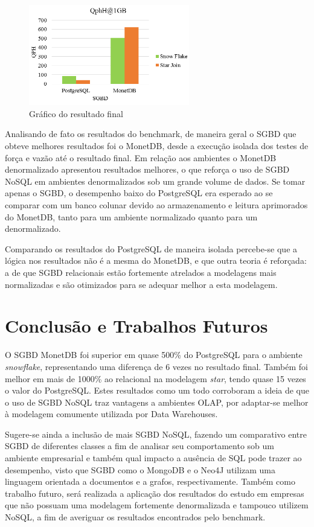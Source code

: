 \documentclass[conference]{IEEEtran}
\begin{document}
\begin{figure}[htpb]
  \centering
  \includegraphics[width=7cm]{resultado}
  \caption{Gráfico do resultado final}
  \label{fig:resultado}
\end{figure}

Analisando de fato os resultados do benchmark, de maneira geral o SGBD que obteve melhores resultados foi o MonetDB, desde a execução isolada dos testes de força e vazão até o resultado final. Em relação aos ambientes o MonetDB denormalizado apresentou resultados melhores, o que reforça o uso de SGBD NoSQL em ambientes denormalizados sob um grande volume de dados. Se tomar apenas o SGBD, o desempenho baixo do PostgreSQL era esperado ao se comparar com um banco colunar devido ao armazenamento e leitura aprimorados do MonetDB, tanto para um ambiente normalizado quanto para um denormalizado. 

Comparando os resultados do PostgreSQL de maneira isolada percebe-se que a lógica nos resultados não é a mesma do MonetDB, e que outra teoria é reforçada: a de que SGBD relacionais estão fortemente atrelados a modelagens mais normalizadas e são otimizados para se adequar melhor a esta modelagem.


\section{Conclusão e Trabalhos Futuros}

O SGBD MonetDB foi superior em quase 500\% do PostgreSQL para o ambiente \textit{snowflake}, representando uma diferença de 6 vezes no resultado final. Também foi melhor em mais de 1000\% ao relacional na modelagem \textit{star}, tendo quase 15 vezes o valor do PostgreSQL. Estes resultados como um todo corroboram a ideia de que o uso de SGBD NoSQL traz vantagens a ambientes OLAP, por adaptar-se melhor à modelagem comumente utilizada por Data Warehouses.

Sugere-se ainda a inclusão de mais SGBD NoSQL, fazendo um comparativo entre SGBD de diferentes classes a fim de analisar seu comportamento sob um ambiente empresarial e também qual impacto a ausência de SQL pode trazer ao desempenho, visto que SGBD como o MongoDB e o Neo4J utilizam uma linguagem orientada a documentos e a grafos, respectivamente. Também como trabalho futuro, será realizada a aplicação dos resultados do estudo em empresas que não possuam uma modelagem fortemente denormalizada e tampouco utilizem NoSQL, a fim de averiguar os resultados encontrados pelo benchmark.
\end{document}

